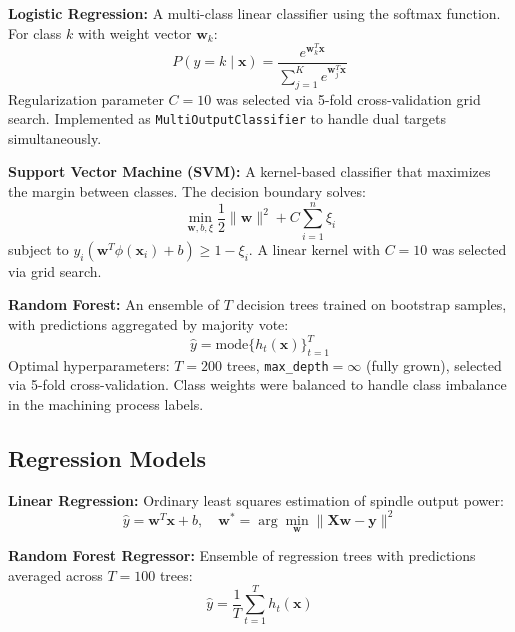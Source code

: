 \documentclass[conference]{IEEEtran}
\begin{document}
\textbf{Logistic Regression:} A multi-class linear classifier using the softmax
function. For class $k$ with weight vector $\mathbf{w}_k$:
\begin{equation}
    P(y=k \mid \mathbf{x}) = \frac{e^{\mathbf{w}_k^T \mathbf{x}}}
    {\sum_{j=1}^{K} e^{\mathbf{w}_j^T \mathbf{x}}}
    \label{eq:logreg}
\end{equation}
Regularization parameter $C=10$ was selected via 5-fold cross-validation grid search.
Implemented as \texttt{MultiOutputClassifier} to handle dual targets simultaneously.

\textbf{Support Vector Machine (SVM):} A kernel-based classifier that maximizes the
margin between classes. The decision boundary solves:
\begin{equation}
    \min_{\mathbf{w},b,\xi} \frac{1}{2}\|\mathbf{w}\|^2 + C\sum_{i=1}^{n}\xi_i
    \label{eq:svm}
\end{equation}
subject to $y_i(\mathbf{w}^T\phi(\mathbf{x}_i)+b) \geq 1-\xi_i$. A linear kernel
with $C=10$ was selected via grid search.

\textbf{Random Forest:} An ensemble of $T$ decision trees trained on bootstrap samples,
with predictions aggregated by majority vote:
\begin{equation}
    \hat{y} = \text{mode}\{h_t(\mathbf{x})\}_{t=1}^{T}
    \label{eq:rf}
\end{equation}
Optimal hyperparameters: $T=200$ trees, \texttt{max\_depth}$=\infty$ (fully grown),
selected via 5-fold cross-validation. Class weights were balanced to handle class
imbalance in the machining process labels.

\subsection{Regression Models}

\textbf{Linear Regression:} Ordinary least squares estimation of spindle output power:
\begin{equation}
    \hat{y} = \mathbf{w}^T\mathbf{x} + b, \quad
    \mathbf{w}^* = \arg\min_{\mathbf{w}} \|\mathbf{X}\mathbf{w} - \mathbf{y}\|^2
    \label{eq:linreg}
\end{equation}

\textbf{Random Forest Regressor:} Ensemble of regression trees with predictions
averaged across $T=100$ trees:
\begin{equation}
    \hat{y} = \frac{1}{T}\sum_{t=1}^{T} h_t(\mathbf{x})
    \label{eq:rfr}
\end{equation}
\end{document}
